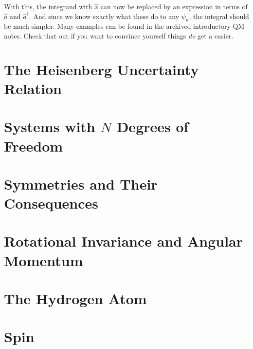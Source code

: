 \documentclass{book}
\theoremstyle{definition}
\begin{document}
With this, the integrand with $\hat{x}$ can now be replaced by an expression in terms of $\hat{a}$ and $\hat{a}^\dagger$. And since we know exactly what these do to any $\psi_n$, the integral should be much simpler. Many examples can be found in the archived introductory QM notes. Check that out if you want to convince yourself things \textit{do} get a easier. 









\newpage



\section{The Heisenberg Uncertainty Relation}



\newpage



\section{Systems with $N$ Degrees of Freedom}



\newpage



\section{Symmetries and Their Consequences}


\newpage



\section{Rotational Invariance and Angular Momentum}




\newpage




\section{The Hydrogen Atom}


\newpage



\section{Spin}
\end{document}
